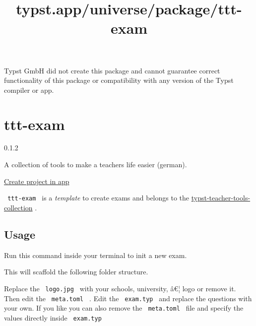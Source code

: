 Typst GmbH did not create this package and cannot guarantee correct
functionality of this package or compatibility with any version of the
Typst compiler or app.


\title{typst.app/universe/package/ttt-exam}

\label{banner}
\label{template-thumbnail}

\section{ttt-exam}\label{ttt-exam}

{ 0.1.2 }

A collection of tools to make a teachers life easier (german).

\href{/app?template=ttt-exam&version=0.1.2}{Create project in app}

\label{readme}
\texttt{\ ttt-exam\ } is a \emph{template} to create exams and belongs
to the
\href{https://github.com/jomaway/typst-teacher-templates}{typst-teacher-tools-collection}
.

\subsection{Usage}\label{usage}

Run this command inside your terminal to init a new exam.

\begin{Shaded}
\begin{Highlighting}[]
\end{Highlighting}
\end{Shaded}

This will scaffold the following folder structure.

\begin{Shaded}
\begin{Highlighting}[]
\end{Highlighting}
\end{Shaded}

Replace the \texttt{\ logo.jpg\ } with your schools, university, â€¦
logo or remove it. Then edit the \texttt{\ meta.toml\ } . Edit the
\texttt{\ exam.typ\ } and replace the questions with your own. If you
like you can also remove the \texttt{\ meta.toml\ } file and specify the
values directly inside \texttt{\ exam.typ\ }


